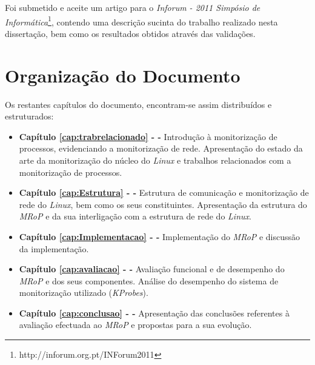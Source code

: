 Foi submetido e aceite um artigo para o \textit{Inforum - 2011 Simpósio de Informática}\footnote{http://inforum.org.pt/INForum2011}, contendo uma descrição sucinta do trabalho realizado nesta dissertação, bem como os resultados obtidos através das validações.\cite{inforum}

\bigskip 


\section{Organização do Documento}
\label{sec:intro_document_outline}

Os restantes capítulos do documento, encontram-se assim distribuídos e estruturados:

\begin{itemize}
	\item \textbf{Capítulo \ref{cap:trabrelacionado} -  - } Introdução à monitorização de processos, evidenciando a monitorização de rede. Apresentação do estado da arte da monitorização do núcleo do \textit{Linux} e trabalhos relacionados com a monitorização de processos.

	\item \textbf{Capítulo \ref{cap:Estrutura} -   - } Estrutura de comunicação e monitorização de rede do \textit{Linux}, bem como os seus constituintes. Apresentação da estrutura do \textit{MRoP} e da sua interligação com a estrutura de rede do \textit{Linux}.

	\item \textbf{Capítulo \ref{cap:Implementacao} -  - } Implementação do \textit{MRoP} e discussão da implementação.

	\item \textbf{Capítulo \ref{cap:avaliacao} -  - } Avaliação funcional e de desempenho do \textit{MRoP} e dos seus componentes. Análise do desempenho do sistema de monitorização utilizado (\textit{KProbes}).

	\item \textbf{Capítulo \ref{cap:conclusao} -  - } Apresentação das conclusões referentes à avaliação efectuada ao \textit{MRoP} e propostas para a sua evolução.

\end{itemize}
